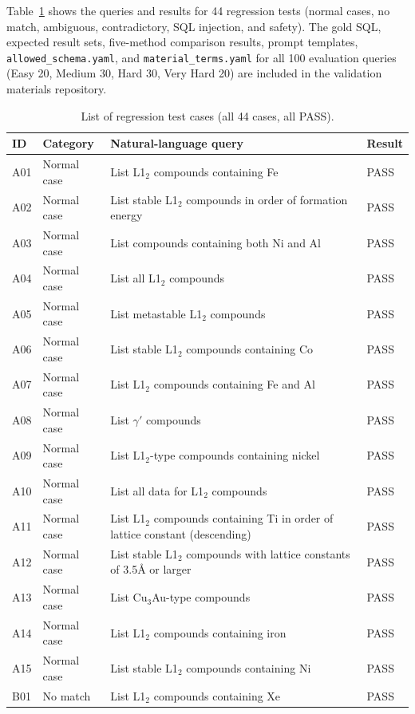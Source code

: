 \documentclass[5p,twocolumn]{elsarticle}
\begin{document}
Table~\ref{tab:sup_all_tests} shows the queries and results for 44 regression tests
(normal cases, no match, ambiguous, contradictory,
SQL injection, and safety).
The gold SQL, expected result sets, five-method comparison results,
prompt templates,
\texttt{allowed\_schema.yaml}, and \texttt{material\_terms.yaml} for all 100 evaluation queries
(Easy 20, Medium 30, Hard 30, Very Hard 20)
are included in the validation materials repository.

\begin{table}[htbp]
\centering
\caption{List of regression test cases (all 44 cases, all PASS).}
\label{tab:sup_all_tests}
\footnotesize
\begin{tabular}{llp{8cm}l}
  \toprule
  ID & Category & Natural-language query & Result \\
  \midrule
  A01 & Normal case & List L1$_2$ compounds containing Fe & PASS \\
  A02 & Normal case & List stable L1$_2$ compounds in order of formation energy & PASS \\
  A03 & Normal case & List compounds containing both Ni and Al & PASS \\
  A04 & Normal case & List all L1$_2$ compounds & PASS \\
  A05 & Normal case & List metastable L1$_2$ compounds & PASS \\
  A06 & Normal case & List stable L1$_2$ compounds containing Co & PASS \\
  A07 & Normal case & List L1$_2$ compounds containing Fe and Al & PASS \\
  A08 & Normal case & List $\gamma'$ compounds & PASS \\
  A09 & Normal case & List L1$_2$-type compounds containing nickel & PASS \\
  A10 & Normal case & List all data for L1$_2$ compounds & PASS \\
  A11 & Normal case & List L1$_2$ compounds containing Ti in order of lattice constant (descending) & PASS \\
  A12 & Normal case & List stable L1$_2$ compounds with lattice constants of 3.5\AA{} or larger & PASS \\
  A13 & Normal case & List Cu$_3$Au-type compounds & PASS \\
  A14 & Normal case & List L1$_2$ compounds containing iron & PASS \\
  A15 & Normal case & List stable L1$_2$ compounds containing Ni & PASS \\
  \midrule
  B01 & No match & List L1$_2$ compounds containing Xe & PASS \\

\end{tabular}
\end{table}
\end{document}
